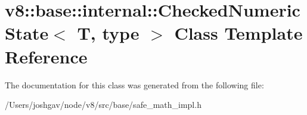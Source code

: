 \hypertarget{classv8_1_1base_1_1internal_1_1_checked_numeric_state}{}\section{v8\+:\+:base\+:\+:internal\+:\+:Checked\+Numeric\+State$<$ T, type $>$ Class Template Reference}
\label{classv8_1_1base_1_1internal_1_1_checked_numeric_state}


The documentation for this class was generated from the following file\+:\begin{DoxyCompactItemize}
\item 
/\+Users/joshgav/node/v8/src/base/safe\+\_\+math\+\_\+impl.\+h\end{DoxyCompactItemize}

